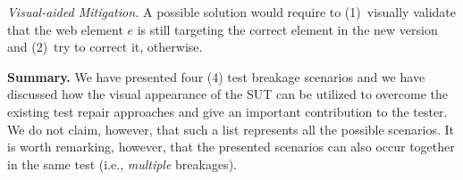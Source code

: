 \noindent
\textit{Visual-aided Mitigation.}
A possible solution would require to (1)~visually validate that the web element $e$ is still targeting the correct element in the new version and (2)~try to correct it, otherwise.

\noindent
\textbf{Summary.}
We have presented four (4) test breakage scenarios and we have discussed how the visual appearance of the SUT can be utilized to overcome the existing test repair approaches and give an important contribution to the tester. We do not claim, however, that such a list represents all the possible scenarios. It is worth remarking, however, that the presented scenarios can also occur together in the same test (i.e., \textit{multiple} breakages).

%
